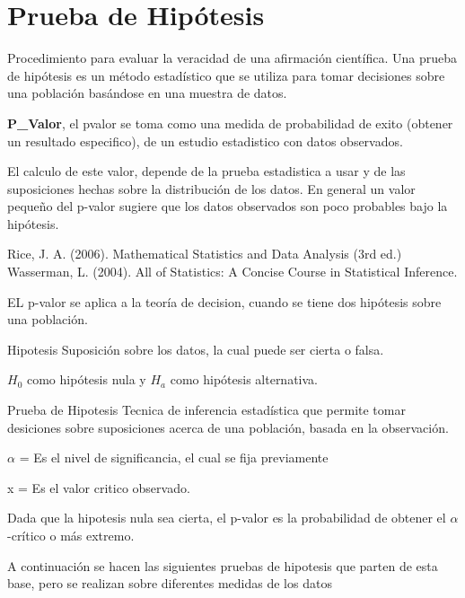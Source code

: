 \section{Prueba de Hipótesis}

Procedimiento para evaluar la veracidad de una afirmación científica.
Una prueba de hipótesis es un método estadístico que se utiliza para tomar decisiones sobre una población basándose en una muestra de datos.






\textbf{P\_Valor}, el p\-valor se toma como una medida de probabilidad de exito (obtener un resultado especifico), de un estudio estadistico con datos observados.

El calculo de este valor, depende de la prueba estadistica a usar y de las suposiciones hechas sobre la distribución de los datos. En general un valor pequeño del p-valor sugiere que los datos observados son poco probables bajo la hipótesis.

Rice, J. A. (2006). Mathematical Statistics and Data Analysis (3rd ed.)
Wasserman, L. (2004). All of Statistics: A Concise Course in Statistical Inference.

EL p-valor se aplica a la teoría de decision, cuando se tiene dos hipótesis sobre una población.

Hipotesis 
Suposición sobre los datos, la cual puede ser cierta o falsa.

$H_0$ como hipótesis nula y $H_a$ como hipótesis alternativa.
  
Prueba de Hipotesis
Tecnica de inferencia estadística que permite tomar desiciones sobre suposiciones acerca de una población, basada en la observación.

$\alpha$ = Es el nivel de significancia, el cual se fija previamente  

x = Es el valor critico observado. 

Dada que la hipotesis nula sea cierta, el p-valor es la probabilidad de obtener el $\alpha$-crítico o más extremo.



A continuación se hacen las siguientes pruebas de hipotesis que parten de esta base, pero se realizan sobre diferentes medidas de los datos 


